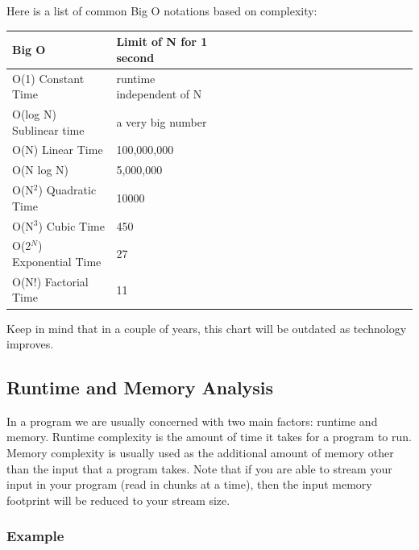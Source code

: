 \documentclass[11pt,oneside]{book}
\begin{document}
Here is a list of common Big O notations based on complexity:

\begin{center}\begin{tabulary}{0.4\linewidth}{|l|l|l|l|l|l|l|l|l|l|l|l|l|l|l|l|l|l|l}\hline


  Big O &
  Limit of N for 1 second\\
\hline


  O(1) Constant Time &
  runtime independent of N\\

  O(log N) Sublinear time &
  a very big number\\

  O(N) Linear Time &
  100,000,000\\

  O(N log N) &
  5,000,000\\

  O(N$^{2}$) Quadratic Time &
  10000\\

  O(N$^{3}$) Cubic Time &
  450\\

  O(2$^{N}$) Exponential Time &
  27\\

  O(N!) Factorial Time &
  11\\

\hline\end{tabulary}\end{center}

Keep in mind that in a couple of years, this chart will be outdated as technology improves.

\subsection{Runtime and Memory Analysis}

In a program we are usually concerned with two main factors: runtime and memory. Runtime complexity is the amount of time it takes for a program to run.  Memory complexity is usually used as the additional amount of memory other than the input that a program takes. Note that if you are able to stream your input in your program (read in chunks at a time), then the input memory footprint will be reduced to your stream size.

\subsubsection{Example}
\end{document}
